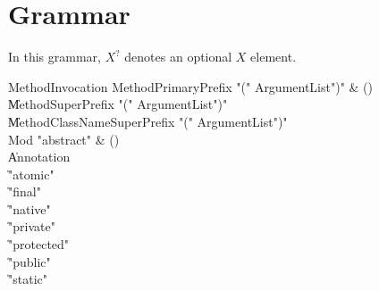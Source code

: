 \chapter{Grammar}


In this grammar, $X^?$ denotes an optional $X$ element.


\begin{bbgrammar}

 MethodInvocation  \label{prod:MethodInvocation}  \: MethodPrimaryPrefix \xcd"(" ArgumentList\opt \xcd")" & ()\\
    \| MethodSuperPrefix \xcd"(" ArgumentList\opt \xcd")"\\
    \| MethodClassNameSuperPrefix \xcd"(" ArgumentList\opt \xcd")"\\
 Mod  \label{prod:Mod}  \: \xcd"abstract" & ()\\
    \| Annotation\\
    \| \xcd"atomic"\\
    \| \xcd"final"\\
    \| \xcd"native"\\
    \| \xcd"private"\\
    \| \xcd"protected"\\
    \| \xcd"public"\\
    \| \xcd"static"\\
\end{bbgrammar}

